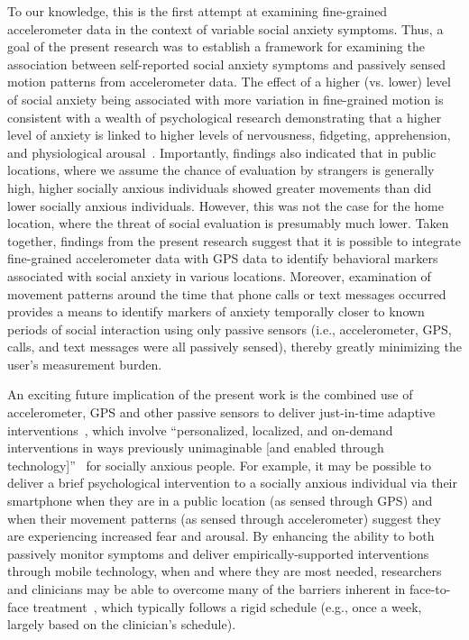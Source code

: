 To our knowledge, this is the first attempt at examining fine-grained accelerometer data in the context of variable social anxiety symptoms.  
Thus, a goal of the present research was to establish a framework for examining the association between self-reported social anxiety symptoms and passively sensed motion patterns from accelerometer data. 
The effect of a higher (vs. lower) level of social anxiety being associated with more variation in fine-grained motion is consistent with a wealth of psychological research demonstrating that a higher level of anxiety is linked to higher levels of nervousness, fidgeting, apprehension, and physiological arousal~\cite{Dunn2015,Rapee1997,wenzel2005}.  Importantly, findings also indicated that in public locations, where we assume the chance of evaluation by strangers is generally high, higher socially anxious individuals showed greater movements than did lower socially anxious individuals.  However, this was not the case for the home location, where the threat of social evaluation is presumably much lower.  Taken together, findings from the present research suggest that it is possible to integrate fine-grained accelerometer data with GPS data to identify behavioral markers associated with social anxiety in various locations. Moreover, examination of movement patterns around the time that phone calls or text messages occurred provides a means to identify markers of anxiety temporally closer to known periods of social interaction using only passive sensors (i.e., accelerometer, GPS, calls, and text messages were all passively sensed), thereby greatly minimizing the user’s measurement burden.

An exciting future implication of the present work is the combined use of accelerometer, GPS and other passive sensors to deliver just-in-time adaptive interventions~\cite{metz2014}, which involve ``personalized, localized, and on-demand interventions in ways previously unimaginable [and enabled through technology]''~\cite{kumar2013mobile} for socially anxious people.  For example, it may be possible to deliver a brief psychological intervention to a socially anxious individual via their smartphone when they are in a public location (as sensed through GPS) and when their movement patterns (as sensed through accelerometer) suggest they are experiencing increased fear and arousal.  By enhancing the ability to both passively monitor symptoms and deliver empirically-supported interventions through mobile technology, when and where they are most needed, researchers and clinicians may be able to overcome many of the barriers inherent in face-to-face treatment~\cite{shani2015,metz2014}, which typically follows a rigid schedule (e.g., once a week, largely based on the clinician's schedule).  

